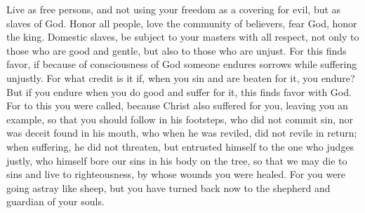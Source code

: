 \begin{biblechapter}
\verse Live as free persons, and not using your freedom as a covering for evil, but as slaves of God.
\verse Honor all people, love the community of believers, fear God, honor the king.
\verse Domestic slaves, be subject to your masters with all respect, not only to those who are good and gentle, but also to those who are unjust.
\verse For this finds favor, if because of consciousness of God someone endures sorrows while suffering unjustly.
\verse For what credit is it if, when you sin and are beaten for it, you endure? But if you endure when you do good and suffer for it, this finds favor with God.
\verse For to this you were called, because Christ also suffered for you, leaving you an example, so that you should follow in his footsteps,
\verse who did not commit sin, nor was deceit found in his mouth,
\verse who when he was reviled, did not revile in return; when suffering, he did not threaten, but entrusted himself to the one who judges justly,
\verse who himself bore our sins in his body on the tree, so that we may die to sins and live to righteousness, by whose wounds you were healed.
\verse For you were going astray like sheep, but you have turned back now to the shepherd and guardian of your souls.
\end{biblechapter}

